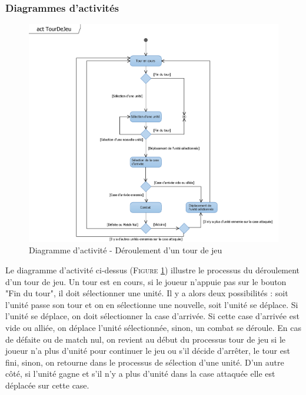 \documentclass[a4paper,11pt]{article}
\begin{document}
		\subsubsection{Diagrammes d'activités}
			\begin{figure}[ht!]
				\includegraphics{actTourDeJeu.png}
				\caption{Diagramme d'activité - Déroulement d'un tour de jeu}
				\label{fig:acttour}
				\end{figure}
			\vspace*{1cm}
			Le diagramme d'activité ci-dessus (\textsc{Figure \ref{fig:acttour}}) illustre le processus du déroulement d'un tour de jeu. Un tour est en cours, si le joueur n'appuie pas sur le bouton "Fin du tour", il doit sélectionner une unité. Il y a alors deux possibilités : soit l'unité passe son tour et on en sélectionne une nouvelle, soit l'unité se déplace. Si l'unité se déplace, on doit sélectionner la case d'arrivée. Si cette case d'arrivée est vide ou alliée, on déplace l'unité sélectionnée, sinon, un combat se déroule. En cas de défaite ou de match nul, on revient au début du processus tour de jeu si le joueur n'a plus d'unité pour continuer le jeu ou s'il décide d'arrêter, le tour est fini, sinon, on retourne dans le processus de sélection d'une unité. D'un autre côté, si l'unité gagne et s'il n'y a plus d'unité dans la case attaquée elle est déplacée sur cette case.
			\newpage
\end{document}
